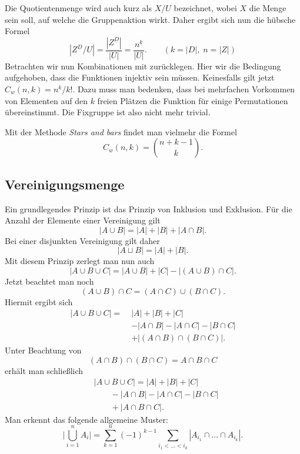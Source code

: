 \documentclass[a4paper,11pt,fleqn,twoside,twocolumn,dvipdfmx]{scrartcl}
\numberwithin{equation}{section}
\begin{document}
Die Quotientenmenge wird auch kurz als $X/U$ bezeichnet,
wobei $X$ die Menge sein soll, auf welche die Gruppenaktion wirkt.
Daher ergibt sich nun die hübsche Formel%
\begin{equation}
|Z^{\underline D}/U| = \frac{|Z^{\underline D}|}{|U|}
= \frac{n^{\underline k}}{|U|}.\qquad(k=|D|,\;n=|Z|)
\end{equation}
%
Betrachten wir nun Kombinationen mit zurücklegen.
Hier wir die Bedingung aufgehoben, dass die Funktionen injektiv
sein müssen. Keinesfalls gilt jetzt $C_w(n,k)=n^k/k!$. Dazu
muss man bedenken, dass bei mehrfachen Vorkommen von Elementen
auf den $k$ freien Plätzen die Funktion für einige Permutationen
übereinstimmt. Die Fixgruppe ist also nicht mehr trivial.

Mit der Methode \emph{Stars and bars} findet man vielmehr
die Formel%
\begin{equation}
C_w(n,k) = \binom{n+k-1}{k}.
\end{equation}

\subsection{Vereinigungsmenge}
Ein grundlegendes Prinzip ist das Prinzip von Inklusion und
Exklusion. Für die Anzahl der Elemente einer Vereinigung
gilt%
\begin{equation}
|A\cup B| = |A|+|B|+|A\cap B|.
\end{equation}
Bei einer disjunkten Vereinigung gilt daher%
\[|A\sqcup B| = |A|+|B|.\]
Mit diesem Prinzip zerlegt man nun auch%
\[|A\cup B\cup C| = |A\cup B|+|C|-|(A\cup B)\cap C|.\]
Jetzt beachtet man noch
\[(A\cup B)\cap C = (A\cap C)\cup(B\cap C).\]
Hiermit ergibt sich
\begin{align*}
|A\cup B\cup C| =\; &|A|+|B|+|C|\\
&-|A\cap B|-|A\cap C|-|B\cap C|\\
&+|(A\cap B)\cap (B\cap C)|.
\end{align*}
Unter Beachtung von
\[(A\cap B)\cap (B\cap C) = A\cap B\cap C\]
erhält man schließlich
\begin{equation}
\begin{split}
&|A\cup B\cup C| = |A|+|B|+|C|\\
&\qquad -|A\cap B|-|A\cap C|-|B\cap C|\\
&\qquad +|A\cap B\cap C|.
\end{split}
\end{equation}
Man erkennt das folgende allgemeine Muster:%
\begin{equation}
\bigg|\bigcup_{i=1}^n A_i\bigg|
= \sum_{k=1}^n (-1)^{k-1} \!\!\!\!\sum_{i_1<\ldots<i_k}\!\!\!\!
|A_{i_1}\cap\ldots\cap A_{i_k}|.
\end{equation}
\end{document}
